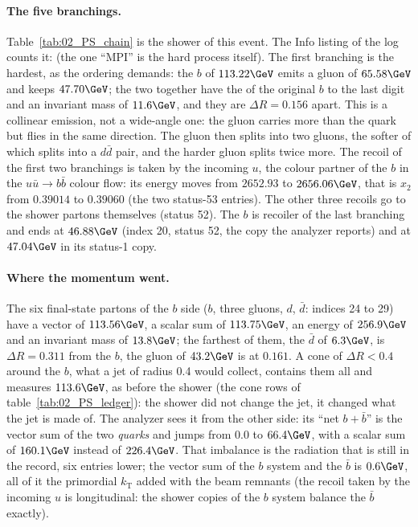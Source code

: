 \paragraph{The five branchings.} Table~\ref{tab:02_PS_chain} is the shower of this event. The Info listing of the
log counts it:  (the one ``MPI'' is the hard process itself). The
first branching is the hardest, as the \pt{} ordering demands: the $b$ of $113.22\GeV$ emits a gluon of $65.58\GeV$
and keeps $47.70\GeV$; the two together have the \pt{} of the original $b$ to the last digit and an invariant mass
of $11.6\GeV$, and they are $\Delta R = 0.156$ apart. This is a collinear emission, not a wide-angle one: the gluon
carries more \pt{} than the quark but flies in the same direction. The gluon then splits into two gluons, the softer
of which splits into a $d\bar d$ pair, and the harder gluon splits twice more. The recoil of the first two branchings
is taken by the incoming $u$, the colour partner of the $b$ in the $u\bar u\to b\bar b$ colour flow: its energy
moves from $2652.93$ to $2656.06\GeV$, that is $x_2$ from $0.39014$ to $0.39060$ (the two status-53 entries). The
other three recoils go to the shower partons themselves (status 52). The $b$ is recoiler of the last branching and
ends at $46.88\GeV$ (index 20, status 52, the copy the analyzer reports) and at $47.04\GeV$ in its status-1 copy.

\paragraph{Where the momentum went.} The six final-state partons of the $b$ side ($b$, three gluons, $d$, $\bar d$:
indices 24 to 29) have a vector \pt{} of $113.56\GeV$, a scalar sum of $113.75\GeV$, an energy of $256.9\GeV$ and
an invariant mass of $13.8\GeV$; the farthest of them, the $\bar d$ of $6.3\GeV$, is $\Delta R = 0.311$ from the
$b$, the gluon of $43.2\GeV$ is at $0.161$. A cone of $\Delta R < 0.4$ around the $b$, what a jet of radius 0.4
would collect, contains them all and measures $113.6\GeV$, as before the shower (the cone rows of
table~\ref{tab:02_PS_ledger}): the shower did not change the jet, it changed what the jet is made of. The analyzer sees it
from the other side: its ``net $b+\bar b$'' is the vector sum of the two \emph{quarks} and jumps from
$0.0$ to $66.4\GeV$, with a scalar sum of $160.1\GeV$ instead of $226.4\GeV$. That imbalance is the radiation
that is still in the record, six entries lower; the vector sum of the $b$ system and the $\bar b$ is $0.6\GeV$, all
of it the primordial $k_\mathrm{T}$ added with the beam remnants (the recoil taken by the incoming $u$ is
longitudinal: the shower copies of the $b$ system balance the $\bar b$ exactly).

